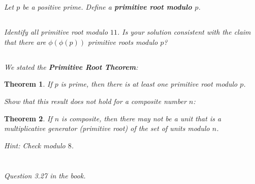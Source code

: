 \documentclass[12pt]{article}
\newtheorem*{thm}{Theorem}
\begin{document}
\section{}
    \subsection{} \textit{Let $p$ be a positive prime. Define a \textbf{primitive root modulo $p$}.}
    \subsection{} \textit{Identify all primitive root modulo $11$. Is your solution consistent with the claim that there are $\phi(\phi(p))$ primitive roots modulo $p$?}
    \subsection{} \textit{We stated the \textbf{Primitive Root Theorem}:}

        \begin{thm}
            If $p$ is prime, then there is at least one primitive root modulo $p$.
        \end{thm}

        \textit{Show that this result does not hold for a composite number $n$:}

        \begin{thm}
            If $n$ is composite, then there may not be a unit that is a multiplicative generator (primitive root) of the set of units modulo $n$.
        \end{thm}

        \textit{Hint: Check modulo $8$.}

\section{} \textit{Question 3.27 in the book.}
\end{document}
